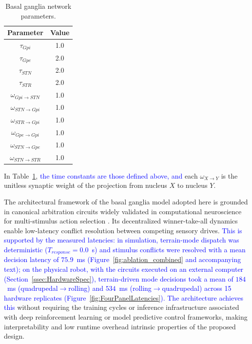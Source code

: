 \documentclass[preprint,12pt]{elsarticle}
\newcommand{\revblue}[1]{\textcolor{blue}{#1}}
\begin{document}
\begin{table}[t]
\centering
\caption{Basal ganglia network parameters.}
\begin{tabular}{|c|c|}
\hline
\textbf{Parameter} & \textbf{Value} \\ \hline
$\tau_{Gpi}$ & 1.0 \\ \hline
$\tau_{Gpe}$ & 2.0 \\ \hline
$\tau_{STN}$ & 2.0 \\ \hline
$\tau_{STR}$ & 2.0 \\ \hline
$\omega_{Gpi\rightarrow STN}$ & 1.0 \\ \hline
$\omega_{STN\rightarrow Gpi}$ & 1.0 \\ \hline
$\omega_{STR\rightarrow Gpi}$ & 1.0 \\ \hline
$\omega_{Gpe\rightarrow Gpi}$ & 1.0 \\ \hline
$\omega_{STN\rightarrow Gpe}$ & 1.0 \\ \hline
$\omega_{STN\rightarrow STR}$ & 1.0 \\ \hline
\end{tabular}
\label{table:Ganglia}
\end{table}

In Table~\ref{table:Ganglia}, \revblue{the time constants are those defined above, and} each $\omega_{X\rightarrow Y}$ is the unitless synaptic weight of the projection from nucleus $X$ to nucleus $Y$.

The architectural framework of the basal ganglia model adopted here is grounded in canonical arbitration circuits widely validated in computational neuroscience for multi-stimulus action selection \citep{Gurney2001a,Gurney2001b,Prescott2006Robot}. Its decentralized winner-take-all dynamics enable low-latency conflict resolution between competing sensory drives. \revblue{This is supported by the measured latencies: in simulation, terrain-mode dispatch was deterministic ($T_{response} = 0.0$~s) and stimulus conflicts were resolved with a mean decision latency of $75.9$~ms (Figure~\ref{fig:ablation_combined} and accompanying text); on the physical robot, with the circuits executed on an external computer (Section~\ref{ssec:HardwareSpec}), terrain-driven mode decisions took a mean of $184$~ms (quadrupedal$\rightarrow$rolling) and $534$~ms (rolling$\rightarrow$quadrupedal) across 15 hardware replicates (Figure~\ref{fig:FourPanelLatencies}). The architecture achieves this} without requiring the training cycles or inference infrastructure associated with deep reinforcement learning or model predictive control frameworks, making interpretability and low runtime overhead intrinsic properties of the proposed design.
\end{document}
